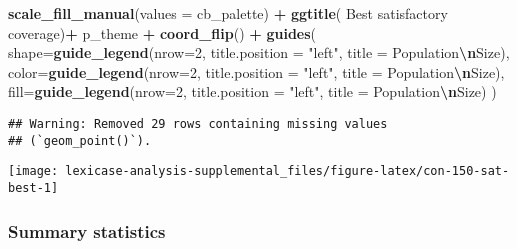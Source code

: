 \documentclass[
]{book}
\newenvironment{Shaded}{\begin{snugshade}}{\end{snugshade}}
\newcommand{\AttributeTok}[1]{\textcolor[rgb]{0.13,0.29,0.53}{#1}}
\newcommand{\DecValTok}[1]{\textcolor[rgb]{0.00,0.00,0.81}{#1}}
\newcommand{\FunctionTok}[1]{\textcolor[rgb]{0.13,0.29,0.53}{\textbf{#1}}}
\newcommand{\NormalTok}[1]{#1}
\newcommand{\SpecialCharTok}[1]{\textcolor[rgb]{0.81,0.36,0.00}{\textbf{#1}}}
\newcommand{\StringTok}[1]{\textcolor[rgb]{0.31,0.60,0.02}{#1}}
\begin{document}
\begin{Shaded}
\begin{Highlighting}[]
  \FunctionTok{scale\_fill\_manual}\NormalTok{(}\AttributeTok{values =}\NormalTok{ cb\_palette) }\SpecialCharTok{+}
  \FunctionTok{ggtitle}\NormalTok{(}\StringTok{\textquotesingle{}  Best satisfactory coverage\textquotesingle{}}\NormalTok{)}\SpecialCharTok{+}
\NormalTok{  p\_theme }\SpecialCharTok{+} \FunctionTok{coord\_flip}\NormalTok{() }\SpecialCharTok{+}
  \FunctionTok{guides}\NormalTok{(}
    \AttributeTok{shape=}\FunctionTok{guide\_legend}\NormalTok{(}\AttributeTok{nrow=}\DecValTok{2}\NormalTok{, }\AttributeTok{title.position =} \StringTok{"left"}\NormalTok{, }\AttributeTok{title =} \StringTok{\textquotesingle{}Population}\SpecialCharTok{\textbackslash{}n}\StringTok{Size\textquotesingle{}}\NormalTok{),}
    \AttributeTok{color=}\FunctionTok{guide\_legend}\NormalTok{(}\AttributeTok{nrow=}\DecValTok{2}\NormalTok{, }\AttributeTok{title.position =} \StringTok{"left"}\NormalTok{, }\AttributeTok{title =} \StringTok{\textquotesingle{}Population}\SpecialCharTok{\textbackslash{}n}\StringTok{Size\textquotesingle{}}\NormalTok{),}
    \AttributeTok{fill=}\FunctionTok{guide\_legend}\NormalTok{(}\AttributeTok{nrow=}\DecValTok{2}\NormalTok{, }\AttributeTok{title.position =} \StringTok{"left"}\NormalTok{, }\AttributeTok{title =} \StringTok{\textquotesingle{}Population}\SpecialCharTok{\textbackslash{}n}\StringTok{Size\textquotesingle{}}\NormalTok{)}
\NormalTok{  )}
\end{Highlighting}
\end{Shaded}

\begin{verbatim}
## Warning: Removed 29 rows containing missing values
## (`geom_point()`).
\end{verbatim}

\texttt{[image: lexicase-analysis-supplemental\_files/figure-latex/con-150-sat-best-1]}

\hypertarget{summary-statistics-2}{%
\subsubsection{Summary statistics}\label{summary-statistics-2}}
\end{document}
